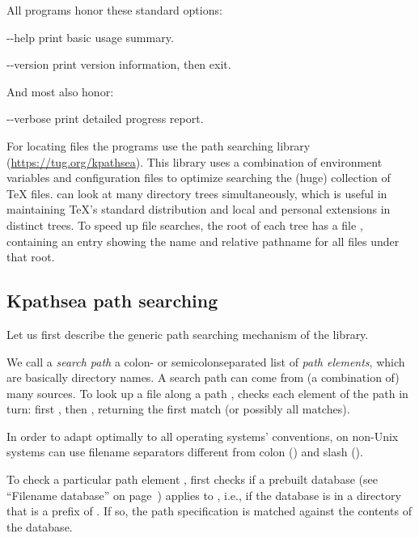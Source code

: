 \documentclass{article}
\begin{document}
All programs honor these standard \GNU options:
\begin{ttdescription}
\item[-{}-help] print basic usage summary.
\item[-{}-version] print version information, then exit.
\end{ttdescription}

And most also honor:
\begin{ttdescription}
\item[-{}-verbose] print detailed progress report.
\end{ttdescription}

For locating files the \Webc{} programs use the path searching library
\KPS{} (\url{https://tug.org/kpathsea}).  This library uses a combination
of environment variables and configuration files to optimize searching
the (huge) collection of \TeX{} files.  \Webc{} can look at many
directory trees simultaneously, which is useful in maintaining \TeX's
standard distribution and local and personal extensions in distinct
trees.  To speed up file searches, the root of each tree has a file
, containing an entry showing the name and relative pathname
for all files under that root.


\subsection{Kpathsea path searching}
\label{sec:kpathsea}

Let us first describe the generic path searching mechanism of the \KPS{}
library.

We call a \emph{search path} a colon- or semicolon\hyph sepa\-rated list
of \emph{path elements}, which are basically directory names.  A
search path can come from (a combination of) many sources.  To look up
a file  along a path , \KPS{} checks each
element of the path in turn: first , then
, returning the first match (or possibly all
matches).

In order to adapt optimally to all operating systems' conventions, on
non-Unix systems \KPS{} can use filename separators different from
colon (\samp{:}) and slash (\samp{/}).

To check a particular path element , \KPS{} first checks if a
prebuilt database (see ``Filename data\-base'' on
page~\pageref{sec:filename-database}) applies to , i.e., if the
database is in a directory that is a prefix of .  If so, the path
specification is matched against the contents of the database.
\end{document}
